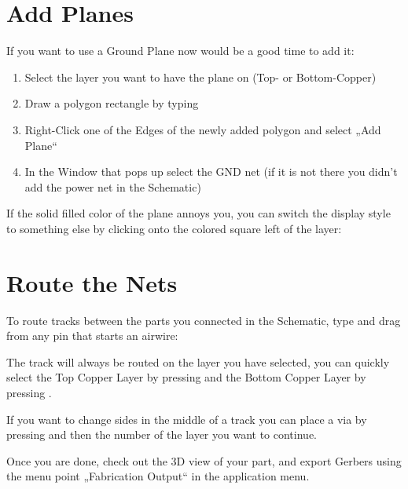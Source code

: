 \documentclass[letterpaper,10pt,czech]{sphinxmanual}
\begin{document}
\section{Add Planes}
\label{\detokenize{create-board:add-planes}}
If you want to use a Ground Plane now would be a good time to add it:
\begin{enumerate}
\def\theenumi{\arabic{enumi}}
\def\labelenumi{\theenumi .}
\makeatletter\def\p@enumii{\p@enumi \theenumi .}\makeatother
\item {} 
Select the layer you want to have the plane on (Top- or Bottom-Copper)

\item {} 
Draw a polygon rectangle by typing 

\item {} 
Right-Click one of the Edges of the newly added polygon and select „Add Plane“

\item {} 
In the Window that pops up select the GND net (if it is not there you didn’t add the power net in the Schematic)

\end{enumerate}

\noindent{}

If the solid filled color of the plane annoys you, you can switch the display style to something else by clicking onto the colored square left of the layer:

\noindent{}


\section{Route the Nets}
\label{\detokenize{create-board:route-the-nets}}
To route tracks between the parts you connected in the Schematic, type  and drag from any pin that starts an airwire:



The track will always be routed on the layer you have selected, you can quickly select the Top Copper Layer by pressing  and the Bottom Copper Layer by pressing .

If you want to change sides in the middle of a track you can place a via by pressing  and then the number of the layer you want to continue.

Once you are done, check out the 3D view of your part, and export Gerbers using the menu point „Fabrication Output“ in the application menu.
\end{document}
